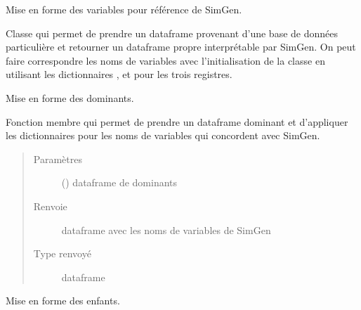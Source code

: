 \documentclass[letterpaper,10pt,french]{sphinxmanual}
\begin{document}

\begin{fulllineitems}
\label{\detokenize{code:simgen.parse}}
Mise en forme des variables pour référence de SimGen.

Classe qui permet de prendre un dataframe provenant d’une base de données particulière et retourner un dataframe propre interprétable par SimGen. On peut faire correspondre les noms de variables avec l’initialisation de la classe en utilisant les dictionnaires ,  et  pour les trois registres.

\begin{fulllineitems}
\label{\detokenize{code:simgen.parse.dominants}}
Mise en forme des dominants.

Fonction membre qui permet de prendre un dataframe dominant et d’appliquer les dictionnaires  pour les noms de variables qui concordent avec SimGen.
\begin{quote}\begin{description}
\item[{Paramètres}] \leavevmode
{} () \textendash{} dataframe de dominants

\item[{Renvoie}] \leavevmode
dataframe avec les noms de variables de SimGen

\item[{Type renvoyé}] \leavevmode
dataframe

\end{description}\end{quote}

\end{fulllineitems}


\begin{fulllineitems}
\label{\detokenize{code:simgen.parse.kids}}
Mise en forme des enfants.


\end{fulllineitems}
\end{fulllineitems}
\end{document}
